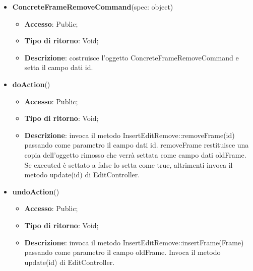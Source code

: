{{{	
	\begin{itemize}
		\item \textbf{ConcreteFrameRemoveCommand}(spec: object)
		\begin{itemize}
			\item \textbf{Accesso}: Public;
			\item \textbf{Tipo di ritorno}: Void;
			\item \textbf{Descrizione}: costruisce l’oggetto ConcreteFrameRemoveCommand e setta il campo dati id.
		\end{itemize}
		\item \textbf{doAction}()
		\begin{itemize}
			\item \textbf{Accesso}: Public;
			\item \textbf{Tipo di ritorno}: Void;
			\item \textbf{Descrizione}: invoca il metodo InsertEditRemove::removeFrame(id) passando come parametro il  campo dati id. removeFrame restituisce una copia dell’oggetto rimosso che verrà settata come campo dati oldFrame. Se executed è settato a false lo setta come true, altrimenti invoca il metodo update(id) di EditController.
		\end{itemize}
		\item \textbf{undoAction}()
		\begin{itemize}
			\item \textbf{Accesso}: Public;
			\item \textbf{Tipo di ritorno}: Void;
			\item \textbf{Descrizione}: invoca il metodo InsertEditRemove::insertFrame(Frame) passando come parametro il campo oldFrame. Invoca il metodo update(id) di EditController.
		\end{itemize}
	\end{itemize}
	}
}}
